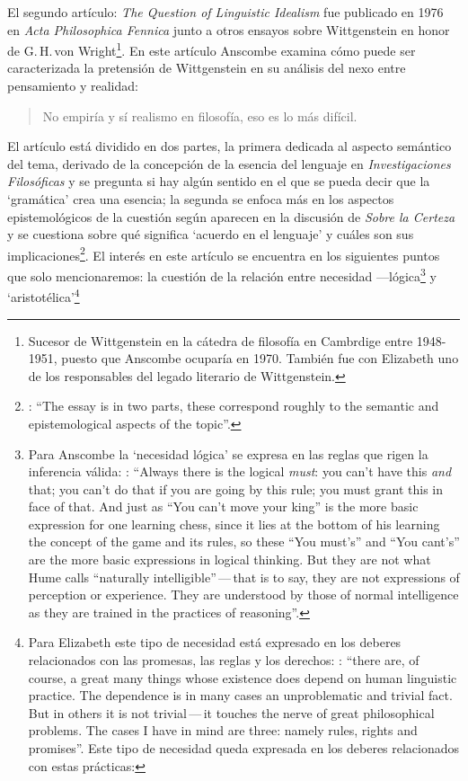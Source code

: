 El segundo artículo: \emph{The Question of Linguistic Idealism} fue publicado en 1976 en \emph{Acta Philosophica Fennica} junto a otros ensayos sobre Wittgenstein en honor de G.\,H.\,von Wright\footnote{Sucesor de Wittgenstein en la cátedra de filosofía en Cambrdige entre 1948-1951, puesto que Anscombe ocuparía en 1970. También fue con Elizabeth uno de los responsables del legado literario de Wittgenstein.}. En este artículo Anscombe examina cómo puede ser caracterizada la pretensión de Wittgenstein en su análisis del nexo entre pensamiento y realidad: \blockquote[{\Cite[VI, 23]{wittgenstein1956remmathes}}]{No empiría y sí realismo en filosofía, eso es lo más difícil.}. 

El artículo está dividido en dos partes, la primera dedicada al aspecto semántico del tema, derivado de la concepción de la esencia del lenguaje en \emph{Investigaciones Filosóficas} y se pregunta si hay algún sentido en el que se pueda decir que la `gramática' crea una esencia; la segunda se enfoca más en los aspectos epistemológicos de la cuestión según aparecen en la discusión de \emph{Sobre la Certeza} y se cuestiona sobre qué significa `acuerdo en el lenguaje' y cuáles son sus implicaciones\footnote{\cite[Cf.][215]{teichmann2008ans}: \enquote{The essay is in two parts, these correspond roughly to the semantic and epistemological aspects of the topic}.}. El interés en este artículo se encuentra en los siguientes puntos que solo mencionaremos: la cuestión de la relación entre necesidad ---lógica\footnote{Para Anscombe la `necesidad lógica' se expresa en las reglas que rigen la inferencia válida: \Cite[Cf.][121]{anscombe1981parmenides:qli}: \enquote{Always there is the logical \emph{must}: you can't have this \emph{and} that; you can't do that if you are going by this rule; you must grant this in face of that. And just as ``You can't move your king'' is the more basic expression for one learning chess, since it lies at the bottom of his learning the concept of the game and its rules, so these ``You must's'' and ``You cant's'' are the more basic expressions in logical thinking. But they are not what Hume calls ``naturally intelligible''\,---\,that is to say, they are not expressions of perception or experience. They are understood by those of normal intelligence as they are trained in the practices of reasoning}.} y `aristotélica'\footnote{Para Elizabeth este tipo de necesidad está expresado en los deberes relacionados con las promesas, las reglas y los derechos: \Cite[Cf.][118]{anscombe1981parmenides:qli}: \enquote{there are, of course, a great many things whose existence does depend on human linguistic practice. The dependence is in many cases an unproblematic and trivial fact. But in others it is not trivial\,---\,it touches the nerve of great philosophical problems. The cases I have in mind are three: namely rules, rights and promises}. Este tipo de necesidad queda expresada en los deberes relacionados con estas prácticas:
}
